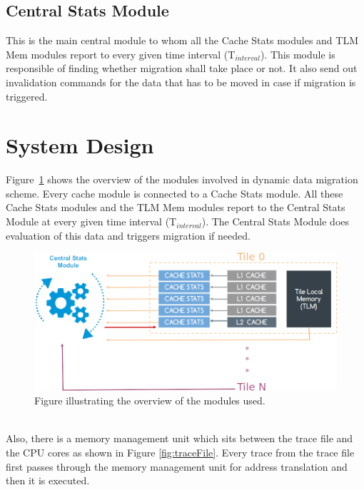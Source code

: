 \documentclass{listhesis}
\begin{document}
\subsection{Central Stats Module}
This is the main central module to whom all the Cache Stats modules and TLM Mem modules report to every given time interval (T$_{interval}$). This module is responsible of finding whether migration shall take place or not. It also send out invalidation commands for the data that has to be moved in case if migration is triggered. 
\section{System Design}
Figure~\ref{fig:overviewOfSolution} shows the overview of the modules involved in dynamic data migration scheme. Every cache module is connected to a Cache Stats module. All these Cache Stats modules and the TLM Mem modules report to the Central Stats Module at every given time interval (T$_{interval}$). The Central Stats Module does evaluation of this data and triggers migration if needed. \\
\begin{figure}
  \includegraphics[width=\linewidth]{moduleconnections.png}
  \centering
  \caption{Figure illustrating the overview of the modules used.}
  \label{fig:overviewOfSolution}
\end{figure}
\\
Also, there is a memory management unit which sits between the trace file and the CPU cores as shown in Figure \ref{fig:traceFile}. Every trace from the trace file first passes through the memory management unit for address translation and then it is executed.\\
\end{document}
